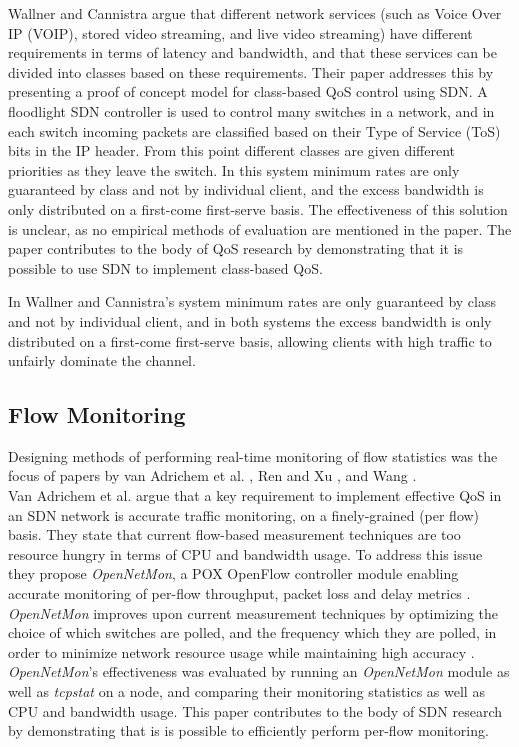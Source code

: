 \documentclass[accepted,single]{gipaper}
\begin{document}
\hspace{10mm} Wallner and Cannistra \cite{Wallner:2013} argue that different network services (such as Voice Over IP (VOIP), stored video streaming, and live video streaming) have different requirements in terms of latency and bandwidth, and that these services can be divided into classes based on these requirements. Their paper addresses this by presenting a proof of concept model for class-based QoS control using SDN. A floodlight SDN controller is used to control many switches in a network, and in each switch incoming packets are classified based on their Type of Service (ToS) bits in the IP header. From this point different classes are given different priorities as they leave the switch. In this system minimum rates are only guaranteed by class and not by individual client, and the excess bandwidth is only distributed on a first-come first-serve basis. The effectiveness of this solution is unclear, as no empirical methods of evaluation are mentioned in the paper. The paper contributes to the body of QoS research by demonstrating that it is possible to use SDN to implement class-based QoS.


\hspace{10mm} In Wallner and Cannistra's \cite{Wallner:2013} system minimum rates are only guaranteed by class and not by individual client, and in both systems the excess bandwidth is only distributed on a first-come first-serve basis, allowing clients with high traffic to unfairly dominate the channel.


\subsection{Flow Monitoring}
\label{flow_monitor}

Designing methods of performing real-time monitoring of flow statistics was the focus of papers by van Adrichem et al. \cite{vanAdrichem}, Ren and Xu \cite{RenOF14}, and Wang \cite{WangMon}.
\\


\hspace{10mm} Van Adrichem et al. \cite{vanAdrichem} argue that a key requirement to implement effective QoS in an SDN network is accurate traffic monitoring, on a finely-grained (per flow) basis. They state that current flow-based measurement techniques are too resource hungry in terms of CPU and bandwidth usage. To address this issue they propose \textit{OpenNetMon}, a POX OpenFlow controller module enabling accurate monitoring of per-flow throughput, packet loss and delay metrics \cite{vanAdrichem}. \textit{OpenNetMon} improves upon current measurement techniques by optimizing the choice of which switches are polled, and the frequency which they are polled, in order to minimize network resource usage while maintaining high accuracy \cite{vanAdrichem}. \textit{OpenNetMon}'s effectiveness was evaluated by running an \textit{OpenNetMon} module as well as \textit{tcpstat} on a node, and comparing their monitoring statistics as well as CPU and bandwidth usage. This paper contributes to the body of SDN research by demonstrating that is is possible to efficiently perform per-flow monitoring.
\end{document}
